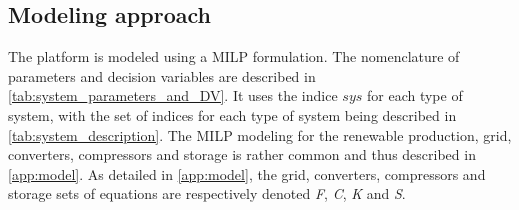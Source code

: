 \subsection{Modeling approach} \label{Models}

The platform is modeled using a MILP formulation. The nomenclature of parameters and decision variables are described in \autoref{tab:system_parameters_and_DV}.
It uses the indice $sys$ for each type of system, with the set of indices for each type of system being described in \autoref{tab:system_description}.
The MILP modeling for the renewable production, grid, converters, compressors and storage is rather common and thus described in \ref{app:model}. As detailed in \ref{app:model}, the grid, converters, compressors and storage sets of equations are respectively denoted \textit{F}, \textit{C}, \textit{K} and \textit{S}.

